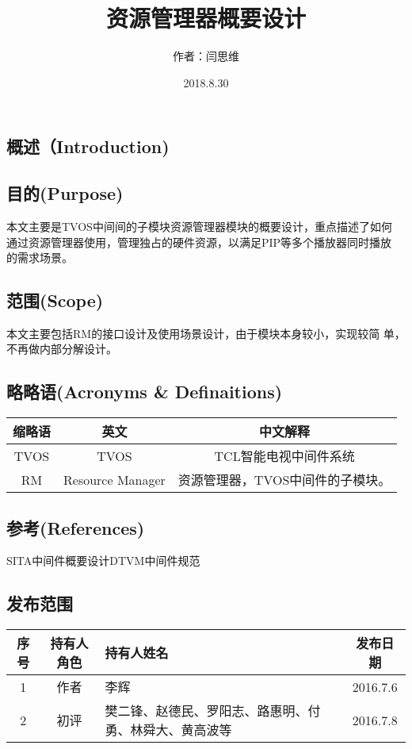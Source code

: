 \documentclass[10pt,a4paper,titlepage]{article} %
\title{资源管理器概要设计}
\author{作者：闫思维}
\date{2018.8.30}
\begin{document}
	\maketitle
	\newpage

	\begin{flushleft}
	\section{概述（Introduction)}
		\subsection{目的(Purpose)}
		本文主要是TVOS中间间的子模块资源管理器模块的概要设计，重点描述了如何
		通过资源管理器使用，管理独占的硬件资源，以满足PIP等多个播放器同时播放
		的需求场景。
		\subsection{范围(Scope)}
		本文主要包括RM的接口设计及使用场景设计，由于模块本身较小，实现较简
		单，不再做内部分解设计。
		\subsection{略略语(Acronyms \& Definaitions)}
		\begin{tabular}{|c|c|c|}
		\hline
		缩略语&英文&中文解释\\
		\hline
		TVOS&TVOS&TCL智能电视中间件系统\\
		\hline
		RM&Resource Manager&资源管理器，TVOS中间件的子模块。\\
		\hline
		\end{tabular}

		\subsection{参考(References)}
		SITA中间件概要设计DTVM中间件规范
		\subsection{发布范围}
		\begin{tabular}{|c|c|p{150pt}|c|}
		\hline
		序号&持有人角色&持有人姓名&发布日期\\
		\hline
		1&作者&李辉&2016.7.6\\
		\hline
		2&初评&樊二锋、赵德民、罗阳志、路惠明、付勇、林舜大、黄高波等&2016.7.8\\
		\hline
		\end{tabular}
		\newpage
	\end{flushleft}
\end{document}
